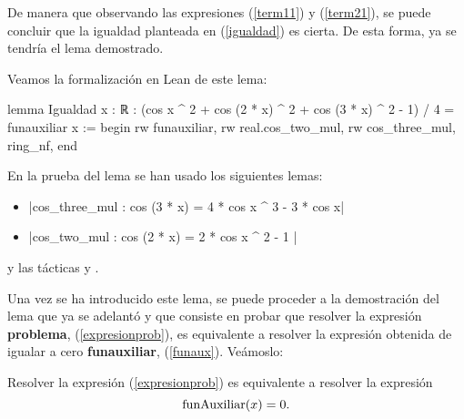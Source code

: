 \begin{demostracion}
De manera que observando las expresiones (\ref{term11}) y
(\ref{term21}), se puede concluir que la igualdad planteada en
(\ref{igualdad}) es cierta.  De esta forma, ya se tendría el lema
demostrado.
\end{demostracion}

Veamos la formalización en Lean de este lema:
\begin{leancode}
lemma Igualdad {x : ℝ} :
  (cos x ^ 2 + cos (2 * x) ^ 2 + cos (3 * x) ^ 2 - 1) / 4 = funauxiliar x :=
begin
  rw funauxiliar,
  rw real.cos_two_mul,
  rw cos_three_mul,
  ring_nf,
end
\end{leancode}

En la prueba del lema se han usado los siguientes lemas:
\begin{itemize}
\item {}|cos_three_mul : cos (3 * x) = 4 * cos x ^ 3 - 3 * cos x|
\item {}|cos_two_mul : cos (2 * x) = 2 * cos x ^ 2 - 1 |
\end{itemize}
y las tácticas
 y
.

Una vez se ha introducido este lema, se puede proceder a la demostración
del lema que ya se adelantó y que consiste en probar que resolver la
expresión \textbf{problema}, (\ref{expresionprob}), es equivalente a
resolver la expresión obtenida de igualar a cero \textbf{funauxiliar},
(\ref{funaux}). Veámoslo:

\begin{lema}[Equivalencia]\label{lemaequivalenciaprob}
  Resolver la expresión (\ref{expresionprob}) es equivalente a resolver
  la expresión
  \begin{equation}\label{probaux}
    \mbox{\rm funAuxiliar}(x) = 0.
  \end{equation}
\end{lema}

